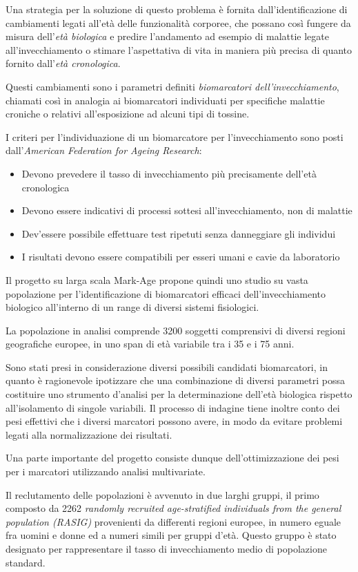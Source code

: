 \documentclass[12pt,openright,twoside,a4paper]{book}
\begin{document}
Una strategia per la soluzione di questo problema è fornita dall'identificazione di cambiamenti legati all'età delle funzionalità corporee, che possano così fungere da misura dell'\textit{età biologica} e predire l'andamento ad esempio di malattie legate all'invecchiamento o stimare l'aspettativa di vita in maniera più precisa di quanto fornito dall'\textit{età cronologica}.

Questi cambiamenti sono i parametri definiti \textit{biomarcatori dell'invecchiamento}, chiamati così in analogia ai biomarcatori individuati per specifiche malattie croniche o relativi all'esposizione ad alcuni tipi di tossine.

I criteri per l'individuazione di un biomarcatore per l'invecchiamento sono posti dall'\textit{American Federation for Ageing Research}:
\begin{itemize}
\item Devono prevedere il tasso di invecchiamento più precisamente dell'età cronologica
\item Devono essere indicativi di processi sottesi all'invecchiamento, non di malattie
\item Dev'essere possibile effettuare test ripetuti senza danneggiare gli individui
\item I risultati devono essere compatibili per esseri umani e cavie da laboratorio
\end{itemize}

Il progetto su larga scala Mark-Age propone quindi uno studio su vasta popolazione per l'identificazione di biomarcatori efficaci dell'invecchiamento biologico all'interno di un range di diversi sistemi fisiologici.

La popolazione in analisi comprende 3200 soggetti comprensivi di diversi regioni geografiche europee, in uno span di età variabile tra i 35 e i 75 anni.

Sono stati presi in considerazione diversi possibili candidati biomarcatori, in quanto è ragionevole ipotizzare che una combinazione di diversi parametri possa costituire uno strumento d'analisi per la determinazione dell'età biologica rispetto all'isolamento di singole variabili.
Il processo di indagine tiene inoltre conto dei pesi effettivi che i diversi marcatori possono avere, in modo da evitare problemi legati alla normalizzazione dei risultati.

Una parte importante del progetto consiste dunque dell'ottimizzazione dei pesi per i marcatori utilizzando analisi multivariate.

Il reclutamento delle popolazioni è avvenuto in due larghi gruppi, il primo composto da 2262 \textit{randomly recruited age-stratified individuals from the general population (RASIG)} provenienti da differenti regioni europee, in numero eguale fra uomini e donne ed a numeri simili per gruppi d'età.
Questo gruppo è stato designato per rappresentare il tasso di invecchiamento medio di popolazione standard.
\end{document}
